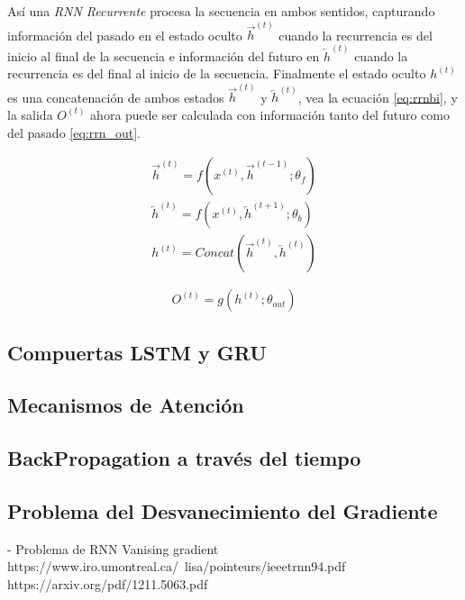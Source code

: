 Así una \textit{RNN Recurrente}  procesa la secuencia en ambos sentidos, capturando información del
pasado en el estado oculto $\overrightarrow{h}^{(t)}$  cuando la recurrencia es del inicio al final
de la secuencia e información del futuro en $\overleftarrow{h}  ^{(t)}$ cuando la recurrencia es del
final al inicio de la secuencia. Finalmente el estado oculto $h^{(t)}$ es una concatenación de ambos
estados $\overrightarrow{h}^{(t)}$ y $\overleftarrow{h}^{(t)}$, vea la ecuación \ref{eq:rrnbi},
y la salida $O^{(t)}$ ahora puede ser calculada con información tanto del futuro como del pasado
\ref{eq:rrn_out}.

\begin{equation}
\begin{split}
    \overrightarrow{h}^{(t)} = f(x^{(t)}, \overrightarrow{h}^{(t-1)}; \theta_f)\\
    \overleftarrow{h}^{(t)} = f(x^{(t)}, \overleftarrow{h}^{(t+1)}; \theta_b)\\
    h^{(t)} = Concat(\overrightarrow{h}^{(t)}, \overleftarrow{h}^{(t)})
\end{split}
\label{eq:rrnbi}
\end{equation}

\begin{equation}
        O^{(t)} = g(h^{(t)}; \theta_{out})
\label{eq:rrn_out}
\end{equation}


\subsection{Compuertas LSTM y GRU}



\subsection{Mecanismos de Atención}

\subsection{BackPropagation a través del tiempo}

\subsection{Problema del Desvanecimiento del Gradiente}
- Problema de RNN
Vanising gradient
https://www.iro.umontreal.ca/~lisa/pointeurs/ieeetrnn94.pdf
https://arxiv.org/pdf/1211.5063.pdf


